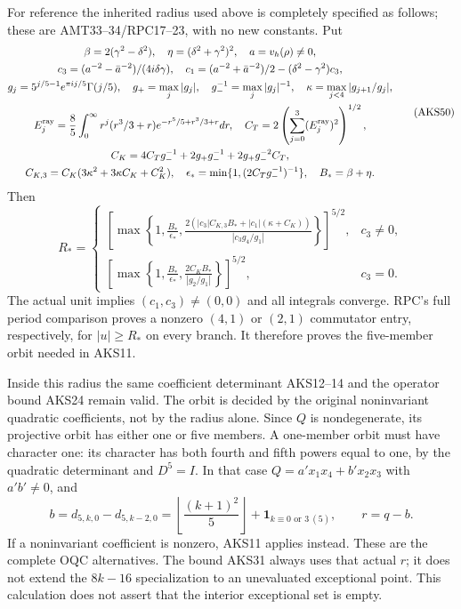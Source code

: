 For reference the inherited radius used above is completely specified
as follows; these are AMT33--34/RPC17--23, with no new constants. Put
\[
\begin{gathered}
 \beta=2(\gamma^2-\delta^2),\quad\eta=(\delta^2+\gamma^2)^2,\quad
 a=v_h(\rho)\ne0,\\
 c_3=(a^{-2}-\bar a^{-2})/(4i\delta\gamma),\quad
 c_1=(a^{-2}+\bar a^{-2})/2-(\delta^2-\gamma^2)c_3,\\
 g_j=5^{j/5-1}e^{\pi ij/5}\Gamma(j/5),\quad
 g_+=\max_j|g_j|,\quad g_-^{-1}=\max_j|g_j|^{-1},\quad
 \kappa=\max_{j<4}|g_{j+1}/g_j|,\\
 E_j^{\rm ray}=\frac85\int_0^\infty r^j(r^3/3+r)
       e^{-r^5/5+r^3/3+r}dr,\quad
 C_T=2\left(\sum_{j=0}^3(E_j^{\rm ray})^2\right)^{1/2},\\
 C_K=4C_Tg_-^{-1}+2g_+g_-^{-1}+2g_+g_-^{-2}C_T,\\
 C_{K,3}=C_K(3\kappa^2+3\kappa C_K+C_K^2),\quad
 \epsilon_* =\min\{1,(2C_Tg_-^{-1})^{-1}\},\quad B_* =\beta+\eta.
\end{gathered}\tag{AKS50}
\]
Then
\[
R_*=
\begin{cases}
\displaystyle\left[\max\left\{1,\frac{B_*}{\epsilon_*},
\frac{2(|c_3|C_{K,3}B_*+|c_1|(\kappa+C_K))}{|c_3g_4/g_1|}
\right\}\right]^{5/2},&c_3\ne0,\\[4pt]
\displaystyle\left[\max\left\{1,\frac{B_*}{\epsilon_*},
\frac{2C_KB_*}{|g_2/g_1|}\right\}\right]^{5/2},&c_3=0.
\end{cases}\tag{AKS51}
\]
The actual unit implies $(c_1,c_3)\ne(0,0)$ and all integrals converge.
RPC's full period comparison proves a nonzero $(4,1)$ or $(2,1)$
commutator entry, respectively, for $|u|\ge R_*$ on every branch. It
therefore proves the five-member orbit needed in AKS11.

Inside this radius the same coefficient determinant AKS12--14 and the
operator bound AKS24 remain valid. The orbit is decided by the original
noninvariant quadratic coefficients, not by the radius alone. Since
$Q$ is nondegenerate, its projective orbit has either one or five
members. A one-member orbit must have character one: its character has
both fourth and fifth powers equal to one, by the quadratic determinant
and $D^5=I$. In that case $Q=a'x_1x_4+b'x_2x_3$ with $a'b'\ne0$, and
\[
 b=d_{5,k,0}-d_{5,k-2,0}
   =\left\lfloor\frac{(k+1)^2}{5}\right\rfloor
           +\mathbf1_{k\equiv0\text{ or }3\ (5)},\qquad r=q-b.
 \tag{AKS52}
\]
If a noninvariant coefficient is nonzero, AKS11 applies instead. These
are the complete OQC alternatives. The bound AKS31 always uses that
actual $r$; it does not extend the $8k-16$ specialization to an
unevaluated exceptional point. This calculation does not assert that
the interior exceptional set is empty.

